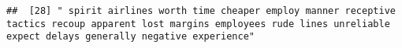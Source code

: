 \documentclass[
]{article}
\begin{document}
\begin{verbatim}
##  [28] " spirit airlines worth time cheaper employ manner receptive tactics recoup apparent lost margins employees rude lines unreliable expect delays generally negative experience"                                                                                                                                                                                                                                                                                                                                                                                                                                                                                                                                                                                                                                                                                                                                                                                                                                                                                                                                                                                                                                                                                                                                                                                                                                                                                                                                                                                                                                                                                                                                                                                                                  

\end{verbatim}
\end{document}
